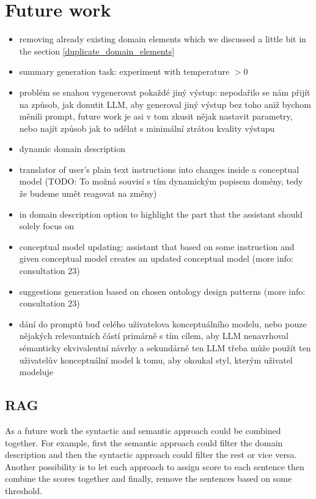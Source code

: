 \chapter{Future work}

\begin{itemize}
\item removing already existing domain elements which we discussed a little bit in the section \ref{duplicate_domain_elements}
\item summary generation task: experiment with temperature $> 0$
\item problém se snahou vygenerovat pokaždé jiný výstup: nepodařilo se nám přijít na způsob, jak donutit LLM, aby generoval jiný výstup bez toho aniž bychom měnili prompt, future work je asi v tom zkusit nějak nastavit parametry, nebo najít způsob jak to udělat s minimální ztrátou kvality výstupu \\
\item dynamic domain description
\item translator of user's plain text instructions into changes inside a conceptual model (TODO: To možná souvisí s tím dynamickým popisem domény, tedy že budeme umět reagovat na změny)
\item in domain description option to highlight the part that the assistant should solely focus on
\item conceptual model updating: assistant that based on some instruction and given conceptual model creates an updated conceptual model (more info: consultation 23)
\item suggestions generation based on chosen ontology design patterns (more info: consultation 23)
\item dání do promptů buď celého uživatelova konceptuálního modelu, nebo pouze nějakých relevantních částí primárně s tím cílem, aby LLM nenavrhoval sémanticky ekvivalentní návrhy a sekundárně ten LLM třeba může použít ten uživatelův konceptuální model k tomu, aby okoukal styl, kterým uživatel modeluje
\end{itemize}


\section{RAG}
As a future work the syntactic and semantic approach could be combined together. For example, first the semantic approach could filter the domain description and then the syntactic approach could filter the rest or vice versa. Another possibility is to let each approach to assign score to each sentence then combine the scores together and finally, remove the sentences based on some threshold.